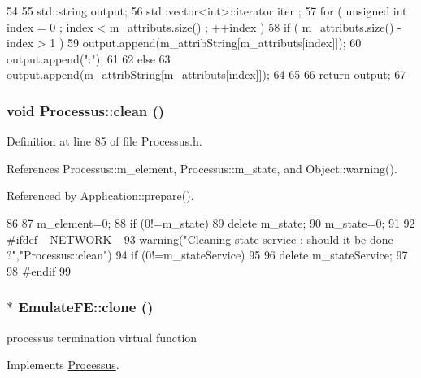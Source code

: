\begin{DoxyCode}
54                             {
55   std::string output;
56   std::vector<int>::iterator iter ;
57   for ( unsigned int index = 0 ; index < m_attributs.size() ; ++index ) {
58     if ( m_attributs.size() - index > 1 ) {
59       output.append(m_attribString[m_attributs[index]]);
60       output.append(":");
61     }
62     else {
63       output.append(m_attribString[m_attributs[index]]);
64     }
65   }
66   return output;
67 }
\end{DoxyCode}
\hypertarget{classProcessus_aaeb17673b98d2b39f3aa780e335e0968}{
\subsubsection[{clean}]{\setlength{\rightskip}{0pt plus 5cm}void Processus::clean ()}}
\label{classProcessus_aaeb17673b98d2b39f3aa780e335e0968}


Definition at line 85 of file Processus.h.

References Processus::m\_\-element, Processus::m\_\-state, and Object::warning().

Referenced by Application::prepare().


\begin{DoxyCode}
86   {
87     m_element=0;
88     if (0!=m_state) {
89       delete m_state;
90       m_state=0;
91     }
92 #ifdef _NETWORK_
93     warning("Cleaning state service : should it be done ?","Processus::clean")
94       if (0!=m_stateService)
95       {
96         delete m_stateService;
97       }
98 #endif
99   }
\end{DoxyCode}
\hypertarget{classEmulateFE_a9a704d0081a275410d19071a006f1a80}{
\subsubsection[{clone}]{$\ast$ EmulateFE::clone ()}}
\label{classEmulateFE_a9a704d0081a275410d19071a006f1a80}
processus termination virtual function 

Implements \hyperlink{classProcessus_aca8856f6d6d7b7e1fe941f298dcbb502}{Processus}.

